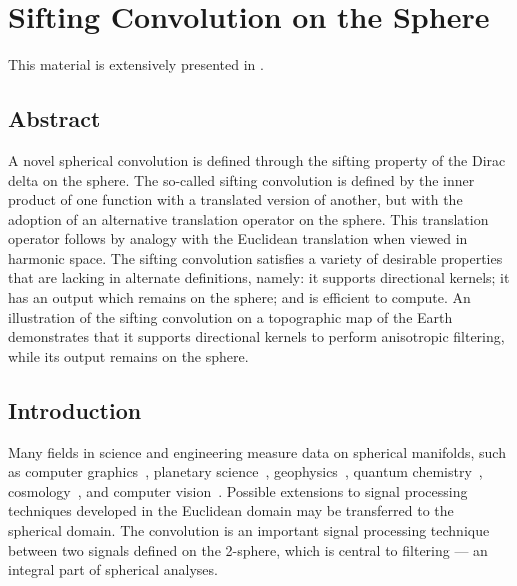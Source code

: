 \chapter{Sifting Convolution on the Sphere}\label{sec:chapter2}

This material is extensively presented in \cite{Roddy2021}.

\section*{Abstract}

A novel spherical convolution is defined through the sifting property of the Dirac delta on the sphere.
The so-called sifting convolution is defined by the inner product of one function with a translated version of another, but with the adoption of an alternative translation operator on the sphere.
This translation operator follows by analogy with the Euclidean translation when viewed in harmonic space.
The sifting convolution satisfies a variety of desirable properties that are lacking in alternate definitions, namely: it supports directional kernels; it has an output which remains on the sphere; and is efficient to compute.
An illustration of the sifting convolution on a topographic map of the Earth demonstrates that it supports directional kernels to perform anisotropic filtering, while its output remains on the sphere.

\section{Introduction}

Many fields in science and engineering measure data on spherical manifolds, such as computer graphics~\cite{Ramamoorthi2004}, planetary science~\cite{Turcotte1981}, geophysics~\cite{Simons2006}, quantum chemistry~\cite{Choi1999}, cosmology~\cite{Bennett1996}, and computer vision~\cite{Cohen2018,Esteves2020,Cobb2021}.
Possible extensions to signal processing techniques developed in the Euclidean domain may be transferred to the spherical domain.
The convolution is an important signal processing technique between two signals defined on the 2-sphere, which is central to filtering --- an integral part of spherical analyses.

